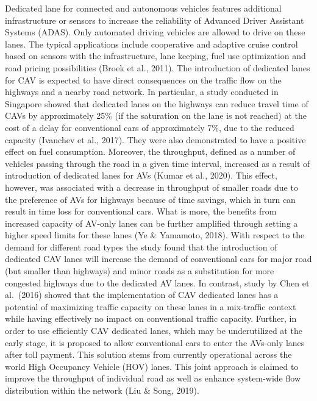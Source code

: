 \documentclass[
]{book}
\begin{document}
Dedicated lane for connected and autonomous vehicles features additional infrastructure or sensors to increase the reliability of Advanced Driver Assistant Systems (ADAS). Only automated driving vehicles are allowed to drive on these lanes. The typical applications include cooperative and adaptive cruise control based on sensors with the infrastructure, lane keeping, fuel use optimization and road pricing possibilities (Broek et al., 2011). The introduction of dedicated lanes for CAV is expected to have direct consequences on the traffic flow on the highways and a nearby road network. In particular, a study conducted in Singapore showed that dedicated lanes on the highways can reduce travel time of CAVs by approximately 25\% (if the saturation on the lane is not reached) at the cost of a delay for conventional cars of approximately 7\%, due to the reduced capacity (Ivanchev et al., 2017). They were also demonstrated to have a positive effect on fuel consumption.
Moreover, the throughput, defined as a number of vehicles passing through the road in a given time interval, increased as a result of introduction of dedicated lanes for AVs (Kumar et al., 2020). This effect, however, was associated with a decrease in throughput of smaller roads due to the preference of AVs for highways because of time savings, which in turn can result in time loss for conventional cars. What is more, the benefits from increased capacity of AV-only lanes can be further amplified through setting a higher speed limits for these lanes (Ye \& Yamamoto, 2018). With respect to the demand for different road types the study found that the introduction of dedicated CAV lanes will increase the demand of conventional cars for major road (but smaller than highways) and minor roads as a substitution for more congested highways due to the dedicated AV lanes.
In contrast, study by Chen et al.~(2016) showed that the implementation of CAV dedicated lanes has a potential of maximizing traffic capacity on these lanes in a mix-traffic context while having effectively no impact on conventional traffic capacity. Further, in order to use efficiently CAV dedicated lanes, which may be underutilized at the early stage, it is proposed to allow conventional cars to enter the AVs-only lanes after toll payment. This solution stems from currently operational across the world High Occupancy Vehicle (HOV) lanes. This joint approach is claimed to improve the throughput of individual road as well as enhance system-wide flow distribution within the network (Liu \& Song, 2019).
\end{document}
